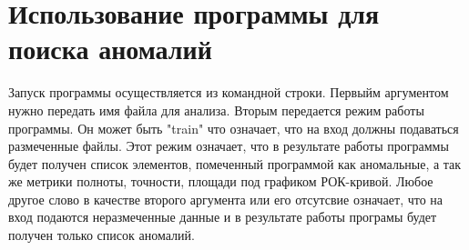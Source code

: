 \section{Использование программы для поиска аномалий}
Запуск программы осуществляется из командной строки. Первыйм аргументом
нужно передать имя файла для анализа. Вторым передается режим работы программы. Он может быть "train" что означает, что на вход должны подаваться размеченные файлы. Этот режим означает, что в результате работы программы будет получен список элементов, помеченный программой как аномальные, а так же метрики полноты, точности, площади под графиком РОК-кривой. Любое другое слово в качестве второго аргумента или его отсутсвие означает, что на вход подаются неразмеченные данные и в результате работы програмы будет получен только список аномалий.
